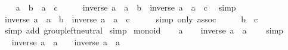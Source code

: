 \begin{isabellebody}
%
\isadelimproof
%
\endisadelimproof
%
\isatagproof
{}\isamarkupfalse%
\isanewline
\ \ \isamarkupfalse%
\ {\isachardoublequoteopen}a\ \isactrlbold {\isacharasterisk}{\kern0pt}\ b\ {\isacharequal}{\kern0pt}\ a\ \isactrlbold {\isacharasterisk}{\kern0pt}\ c{\isachardoublequoteclose}\isanewline
\ \ \isamarkupfalse%
\ \isamarkupfalse%
\ {\isachardoublequoteopen}inverse\ a\ \isactrlbold {\isacharasterisk}{\kern0pt}\ {\isacharparenleft}{\kern0pt}a\ \isactrlbold {\isacharasterisk}{\kern0pt}\ b{\isacharparenright}{\kern0pt}\ {\isacharequal}{\kern0pt}\ inverse\ a\ \isactrlbold {\isacharasterisk}{\kern0pt}\ {\isacharparenleft}{\kern0pt}a\ \isactrlbold {\isacharasterisk}{\kern0pt}\ c{\isacharparenright}{\kern0pt}{\isachardoublequoteclose}\ \isamarkupfalse%
\ simp\isanewline
\ \ \isamarkupfalse%
\ \isamarkupfalse%
\ {\isachardoublequoteopen}{\isacharparenleft}{\kern0pt}inverse\ a\ \isactrlbold {\isacharasterisk}{\kern0pt}\ a{\isacharparenright}{\kern0pt}\ \isactrlbold {\isacharasterisk}{\kern0pt}\ b\ {\isacharequal}{\kern0pt}\ {\isacharparenleft}{\kern0pt}inverse\ a\ \isactrlbold {\isacharasterisk}{\kern0pt}\ a{\isacharparenright}{\kern0pt}\ \isactrlbold {\isacharasterisk}{\kern0pt}\ c{\isachardoublequoteclose}\isanewline
\ \ \ \ \isamarkupfalse%
\ {\isacharparenleft}{\kern0pt}simp\ only{\isacharcolon}{\kern0pt}\ assoc{\isacharparenright}{\kern0pt}\isanewline
\ \ \isamarkupfalse%
\ \isamarkupfalse%
\ {\isachardoublequoteopen}b\ {\isacharequal}{\kern0pt}\ c{\isachardoublequoteclose}\ \isamarkupfalse%
\ {\isacharparenleft}{\kern0pt}simp\ add{\isacharcolon}{\kern0pt}\ group{\isacharunderscore}{\kern0pt}left{\isacharunderscore}{\kern0pt}neutral{\isacharparenright}{\kern0pt}\isanewline
{}\isamarkupfalse%
\ simp%
\endisatagproof
{\isafoldproof}%
%
\isadelimproof
\isanewline
%
\endisadelimproof
\isanewline
{}\isamarkupfalse%
\ monoid\isanewline
%
\isadelimproof
%
\endisadelimproof
%
\isatagproof
{}\isamarkupfalse%
\isanewline
\ \ \isamarkupfalse%
\ a\isanewline
\ \ \isamarkupfalse%
\ {\isachardoublequoteopen}inverse\ a\ \isactrlbold {\isacharasterisk}{\kern0pt}\ a\ {\isacharequal}{\kern0pt}\ \ \isamarkupfalse%
\ simp\isanewline
\ \ \isamarkupfalse%
\ \isamarkupfalse%
\ {\isachardoublequoteopen}inverse\ a\ \isactrlbold {\isacharasterisk}{\kern0pt}\ {\isacharparenleft}{\kern0pt}a\ \isactrlbold {\isacharasterisk}{\kern0pt}\ \ {\isacharequal}{\kern0pt}\ inverse\ a\ \isactrlbold {\isacharasterisk}{\kern0pt}\ a{\isachardoublequoteclose}\isanewline

\end{isabellebody}

